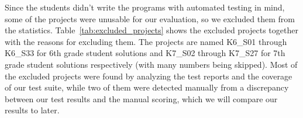 Since the students didn't write the programs with automated testing in mind,
some of the projects were unusable for our evaluation, so we excluded them from the statistics.
Table~\ref{tab:excluded_projects} shows the excluded projects together with the reasons for excluding them.
The projects are named K6\_S01 through K6\_S33 for 6th grade student solutions
and K7\_S02 through K7\_S27 for 7th grade student solutions respectively (with many numbers being skipped).
Most of the excluded projects were found by analyzing the test reports and the coverage of our test suite,
while two of them were detected manually from a discrepancy between our test results and the manual scoring,
which we will compare our results to later.


